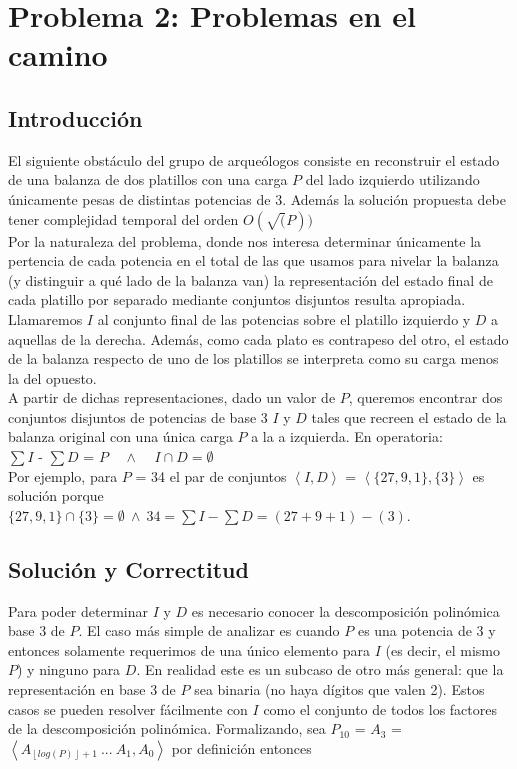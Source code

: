 \section{Problema 2: Problemas en el camino}

\subsection{Introducción}
	El siguiente obstáculo del grupo de arqueólogos consiste en reconstruir el estado de una balanza de dos platillos con una carga $P$ del lado izquierdo utilizando únicamente pesas de distintas potencias de 3. Además la solución propuesta debe tener complejidad temporal del orden $O(\sqrt(P))$
	\\ 

	Por la naturaleza del problema, donde nos interesa determinar únicamente la pertencia de cada potencia en el total de las que usamos para nivelar la balanza (y distinguir a qué lado de la balanza van) la representación del estado final de cada platillo por separado mediante conjuntos disjuntos resulta apropiada. Llamaremos $I$ al conjunto final de las potencias sobre el platillo izquierdo y $D$ a aquellas de la derecha. Además, como cada plato es contrapeso del otro, el estado de la balanza respecto de uno de los platillos se interpreta como su carga menos la del opuesto. 
	\\

	A partir de dichas representaciones, dado un valor de $P$, queremos encontrar dos conjuntos disjuntos de potencias de base 3 $I$ y $D$ tales que recreen el estado de la balanza original con una única carga $P$ a la a izquierda. En operatoria:
	\\

	$\sum I$ - $\sum D$ = $P$ \ \ $\wedge$ \ \ $I \cap D = \emptyset$ 
	\\ 
	
	Por ejemplo, para $P$ = 34 el par de conjuntos $\left \langle I,D  \right \rangle$ = $\left \langle \{27,9,1\},\{3\}  \right \rangle$ es solución porque \\
	$\{27,9,1\} \cap \{3\} = \emptyset \ \wedge \ 34 = \sum I - \sum D = (27+9+1)-(3)$.
	\\
	
	

\newpage 
\subsection{Solución y Correctitud}
	Para poder determinar $I$ y $D$ es necesario conocer la descomposición polinómica base 3 de $P$. El caso más simple de analizar es cuando $P$ es una potencia de 3 y entonces solamente requerimos de una único elemento para $I$ (es decir, el mismo $P$) y ninguno para $D$. En realidad este es un subcaso de otro más general: que la representación en base 3 de $P$ sea binaria (no haya dígitos que valen 2). Estos casos se pueden resolver fácilmente con $I$ como el conjunto de todos los factores de la descomposición polinómica. Formalizando, sea $P_{10}$ = $A_3$ = $\left \langle A_{ \left \lfloor{log(P)}\right \rfloor + 1 } \ ... \ A_1, A_0  \right \rangle$ por definición entonces \\
	
